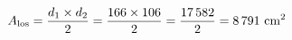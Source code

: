 \documentclass[preview]{standalone}
\begin{document}
\begin{align*}
\special{dvisvgm:raw <g id='unique000'>}A_{\text{los}} = \frac{d_1 \times d_2}{2}= \frac{166 \times 106}{2} = \frac{17\,582}{2} = 8\,791 \text{ cm}^2\special{dvisvgm:raw </g>}
\end{align*}
\end{document}
